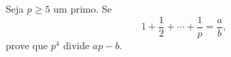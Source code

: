 Seja $p \ge 5$ um primo. Se \[
	1 + \frac{1}{2} + \cdots + \frac{1}{p} = \frac{a}{b},
\]
prove que $p^4$ divide $ap - b$.
